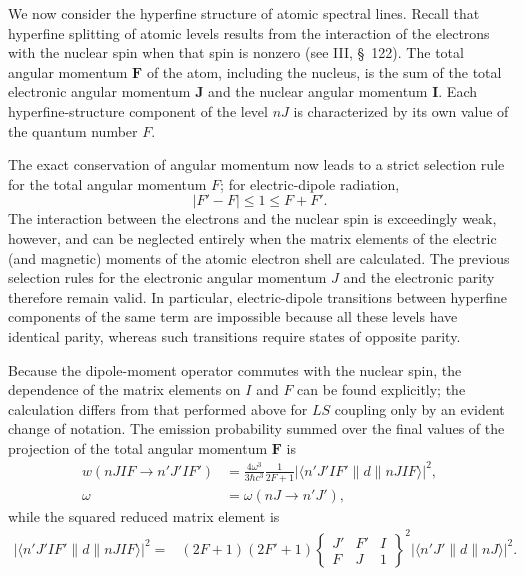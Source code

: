 We now consider the hyperfine structure of atomic spectral lines. Recall that hyperfine splitting of atomic levels results from the interaction of the electrons with the nuclear spin when that spin is nonzero (see III, \S~122). The total angular momentum $\mathbf F$ of the atom, including the nucleus, is the sum of the total electronic angular momentum $\mathbf J$ and the nuclear angular momentum $\mathbf I$. Each hyperfine-structure component of the level $nJ$ is characterized by its own value of the quantum number $F$.

The exact conservation of angular momentum now leads to a strict selection rule for the total angular momentum $F$; for electric-dipole radiation,
\begin{equation}
|F'-F|\leq1\leq F+F'.
\tag{49.17}
\end{equation}
The interaction between the electrons and the nuclear spin is exceedingly weak, however, and can be neglected entirely when the matrix elements of the electric (and magnetic) moments of the atomic electron shell are calculated. The previous selection rules for the electronic angular momentum $J$ and the electronic parity therefore remain valid. In particular, electric-dipole transitions between hyperfine components of the same term are impossible because all these levels have identical parity, whereas such transitions require states of opposite parity.

Because the dipole-moment operator commutes with the nuclear spin, the dependence of the matrix elements on $I$ and $F$ can be found explicitly; the calculation differs from that performed above for $LS$ coupling only by an evident change of notation. The emission probability summed over the final values of the projection of the total angular momentum $\mathbf F$ is
\begin{equation}
\begin{aligned}
w(nJIF\to n'J'IF')&=\frac{4\omega^3}{3\hbar c^3}\frac1{2F+1}
|\langle n'J'IF'\|d\|nJIF\rangle|^2,\\
\omega&=\omega(nJ\to n'J'),
\end{aligned}
\tag{49.18}
\end{equation}
while the squared reduced matrix element is
\begin{equation}
\begin{aligned}
|\langle n'J'IF'\|d\|nJIF\rangle|^2={}&(2F+1)(2F'+1)
\begin{Bmatrix}J'&F'&I\\F&J&1\end{Bmatrix}^{\!2}
|\langle n'J'\|d\|nJ\rangle|^2.
\end{aligned}
\tag{49.19}
\end{equation}

